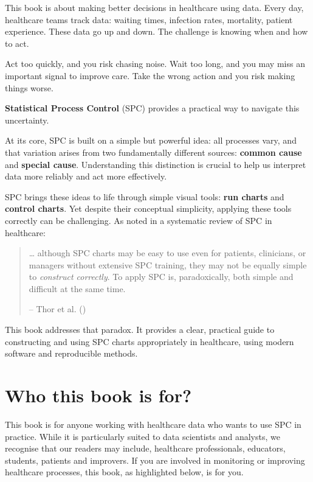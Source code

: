 \documentclass[
]{book}
\begin{document}
This book is about making better decisions in healthcare using data.
Every day, healthcare teams track data: waiting times, infection rates, mortality, patient experience. These data go up and down. The challenge is knowing when and how to act.

Act too quickly, and you risk chasing noise. Wait too long, and you may miss an important signal to improve care. Take the wrong action and you risk making things worse.

\textbf{Statistical Process Control} (SPC) provides a practical way to navigate this uncertainty.

At its core, SPC is built on a simple but powerful idea: all processes vary, and that variation arises from two fundamentally different sources: \textbf{common cause} and \textbf{special cause}. Understanding this distinction is crucial to help us interpret data more reliably and act more effectively.

SPC brings these ideas to life through simple visual tools: \textbf{run charts} and \textbf{control charts}. Yet despite their conceptual simplicity, applying these tools correctly can be challenging. As noted in a systematic review of SPC in healthcare:

\begin{quote}
\ldots{} although SPC charts may be easy to use even for patients, clinicians, or managers without extensive SPC training, they may not be equally simple to \emph{construct correctly}. To apply SPC is, paradoxically, both simple and difficult at the same time.

-- Thor et al. ()
\end{quote}

This book addresses that paradox. It provides a clear, practical guide to constructing and using SPC charts appropriately in healthcare, using modern software and reproducible methods.

\section*{Who this book is for?}\label{who-this-book-is-for}

This book is for anyone working with healthcare data who wants to use SPC in practice. While it is particularly suited to data scientists and analysts, we recognise that our readers may include, healthcare professionals, educators, students, patients and improvers. If you are involved in monitoring or improving healthcare processes, this book, as highlighted below, is for you.
\end{document}
